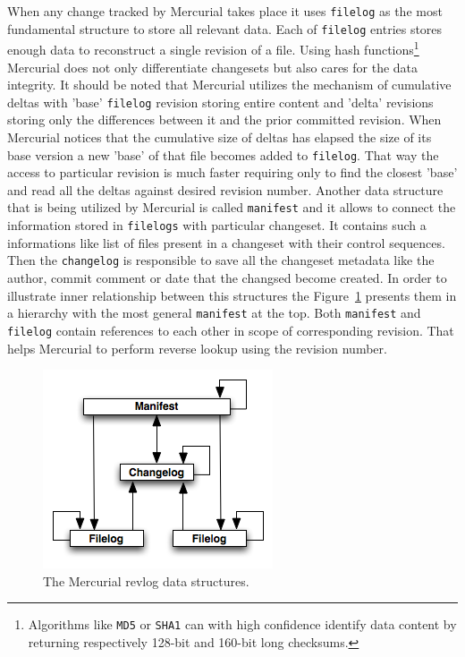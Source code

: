 When any change tracked by Mercurial takes place it uses \texttt{filelog} as the most fundamental structure to store all relevant data. Each of \texttt{filelog} entries stores enough data to reconstruct a single revision of a file. Using hash functions\footnote{Algorithms like \texttt{MD5} or \texttt{SHA1} can with high confidence identify data content  by returning respectively 128-bit and 160-bit long checksums.} Mercurial does not only differentiate changesets but also cares for  the data integrity. It should be noted that Mercurial utilizes the mechanism of cumulative deltas with 'base' \texttt{filelog} revision storing entire content and 'delta' revisions storing only the differences between it and the prior committed revision. When Mercurial notices that the cumulative size of deltas has elapsed the size of its base version a new 'base' of that file becomes added to \texttt{filelog}. That way the access to particular revision is much faster requiring only to find the closest 'base' and read all the deltas against desired revision number. Another data structure that is being utilized by Mercurial is called \texttt{manifest} and it allows to connect the information stored in \texttt{filelogs} with particular changeset. It contains such a informations like list of files present in a changeset with their control sequences. Then the \texttt{changelog} is responsible to save all the changeset metadata like the author, commit comment or date that the changsed become created. In order to illustrate inner relationship between this structures the Figure~\ref{fig:hg_revlog} presents them in a hierarchy with the most general \texttt{manifest} at the top. Both \texttt{manifest} and \texttt{filelog} contain references to each other in scope of corresponding revision. That helps Mercurial to perform reverse lookup using the revision number.
\begin{figure}[ht]
\begin{center}
\includegraphics[scale=0.6]{charts/hg_revlog.png}
\caption{The Mercurial revlog data structures.}
\label{fig:hg_revlog}
\end{center}
\end{figure}
